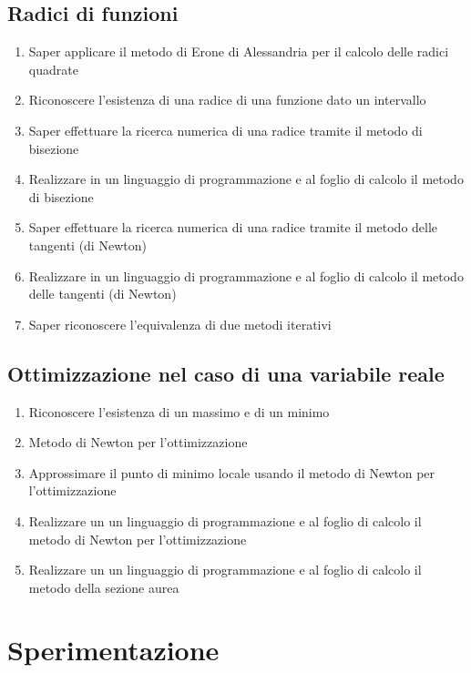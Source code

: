 \documentclass[a4paper]{easychair}
\begin{document}
\subsection[Radici]{Radici di funzioni}

\begin{enumerate}
  \item Saper applicare il metodo di Erone di Alessandria per il calcolo delle radici quadrate
  \item
    Riconoscere l'esistenza di una radice di una funzione dato un intervallo
  \item
    Saper effettuare la ricerca numerica di una radice tramite il metodo
    di bisezione
  \item
    Realizzare in un linguaggio di programmazione e al foglio di calcolo
    il metodo di bisezione
    \item
    Saper effettuare la ricerca numerica di una radice tramite il metodo
    delle tangenti (di Newton)
  \item
    Realizzare in un linguaggio di programmazione e al foglio di calcolo
    il metodo delle tangenti (di Newton)
  \item
    Saper riconoscere l'equivalenza di due metodi iterativi
\end{enumerate}

\subsection[Ottimizzazione]{Ottimizzazione nel caso di una variabile reale}

\begin{enumerate}
  \item
  Riconoscere l'esistenza di un massimo e di un minimo
  \item
    Metodo di Newton per l'ottimizzazione
  \item
    Approssimare il punto di minimo locale usando il metodo di Newton
  per l'ottimizzazione
  \item
    Realizzare un un linguaggio di programmazione e al foglio di calcolo
  il metodo di Newton per l'ottimizzazione
  \item
    Realizzare un un linguaggio di programmazione e al foglio di calcolo
  il metodo della sezione aurea
\end{enumerate}


\section{Sperimentazione}
\end{document}
